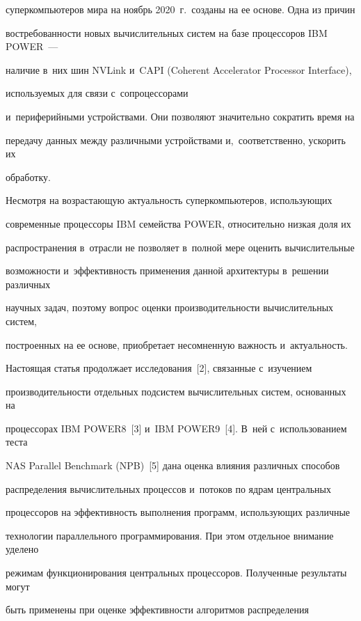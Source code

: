 суперкомпьютеров мира на ноябрь 2020~г.\ созданы на ее основе. Одна из причин 


востребованности новых вычислительных систем на базе процессоров IBM POWER~--- 


наличие в~них шин NVLink и~CAPI (Coherent Accelerator Processor Interface), 


используемых для связи с~сопроцессорами 


и~периферийными устройствами. Они позволяют значительно сократить время на 


передачу данных между различными устройствами и,~соответственно, ускорить их 


обработку.





Несмотря на возрастающую актуальность суперкомпьютеров, использующих 


современные процессоры IBM семейства POWER, относительно низкая доля их 


распространения в~отрасли не позволяет в~полной мере оценить вычислительные 


возможности и~эффективность применения данной архитектуры в~решении различных 


научных задач, поэтому вопрос оценки производительности вычислительных систем, 


построенных на ее основе, приобретает несомненную важность и~актуальность.





Настоящая статья продолжает исследования~[2], связанные с~изучением 


производительности отдельных подсистем вычислительных систем, основанных на 


процессорах IBM POWER8~[3] и~IBM POWER9~[4]. В~ней с~использованием теста 


NAS Parallel Benchmark (NPB)~[5] дана оценка влияния различных способов 


распределения вычислительных процессов и~потоков по ядрам центральных 


процессоров на эффективность выполнения программ, использующих различные 


технологии параллельного программирования. При этом отдельное внимание уделено 


режимам функционирования центральных процессоров. Полученные результаты могут 


быть применены при оценке эффективности алгоритмов распределения 


